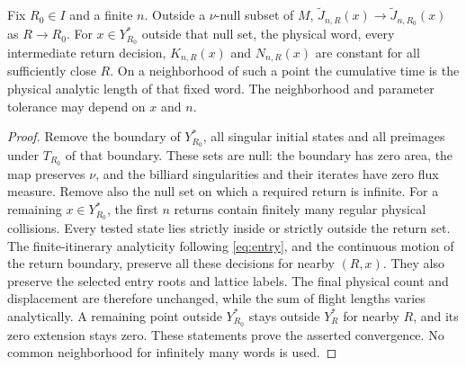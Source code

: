 \begin{lemma}
\label{lem:finite-return-stability}
Fix $R_0\in I$ and a finite $n$. Outside a $\nu$-null subset of $M$,
$\widetilde J_{n,R}(x)\to\widetilde J_{n,R_0}(x)$ as $R\to R_0$.
For $x\in Y_{R_0}^*$ outside that null set, the physical word, every
intermediate return decision, $K_{n,R}(x)$ and $N_{n,R}(x)$ are constant
for all sufficiently close $R$. On a neighborhood of such a point the
cumulative time is the physical analytic length of that fixed word.
The neighborhood and parameter tolerance may depend on $x$ and $n$.
\end{lemma}
\begin{proof}
Remove the boundary of $Y_{R_0}^*$, all singular initial states and all
preimages under $T_{R_0}$ of that boundary. These sets are null: the
boundary has zero area, the map preserves $\nu$, and the billiard
singularities and their iterates have zero flux measure. Remove also
the null set on which a required return is infinite. For a remaining
$x\in Y_{R_0}^*$, the first $n$ returns contain finitely many regular
physical collisions. Every tested state lies strictly inside or strictly
outside the return set. The finite-itinerary analyticity following
\eqref{eq:entry}, and the continuous motion of the return boundary,
preserve all these decisions for nearby $(R,x)$. They also preserve
the selected entry roots and lattice labels. The final physical count
and displacement are therefore unchanged, while the sum of flight
lengths varies analytically. A remaining point outside $Y_{R_0}^*$
stays outside $Y_R^*$ for nearby $R$, and its zero extension stays zero.
These statements prove the asserted convergence. No common neighborhood
for infinitely many words is used.
\end{proof}

